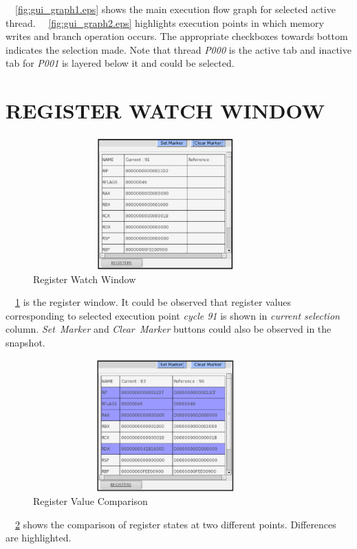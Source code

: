 ~\figurename {~\ref{fig:gui_graph1.eps}} shows the main execution flow graph for selected active thread.  
~\figurename {~\ref{fig:gui_graph2.eps}} highlights execution points in which memory writes and branch operation occurs. The appropriate checkboxes towards bottom indicates the selection made. Note that thread {\it P000} is the active tab and inactive tab for {\it P001} is layered below it and could be selected.
\section {REGISTER WATCH WINDOW}
\begin{figure}[h]
\centering
\includegraphics[width=4in, height=2in]{./figures/gui_reg1.eps}
\caption{Register Watch Window}
\label{fig:gui_reg1.eps}
\end{figure}
~\figurename {~\ref{fig:gui_reg1.eps}} is the register window. It could be observed that register values corresponding to selected execution point {\it cycle 91} is shown in {\it current selection} column. {\it Set~Marker} and {\it Clear~Marker} buttons could also be observed in the snapshot.
\begin{figure}[h]
\centering
\includegraphics[width=4in, height=2in]{./figures/gui_reg2.eps}
\caption{Register Value Comparison}
\label{fig:gui_reg2.eps}
\end{figure}
~\figurename {~\ref{fig:gui_reg2.eps}} shows the comparison of register states at two different points. Differences are highlighted.
